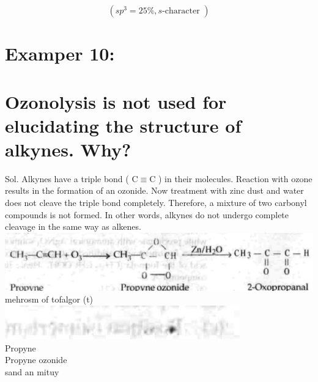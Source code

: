 \documentclass[10pt]{article}
\begin{document}
$$
\left(s p^{3}=25 \%, s \text {-character }\right)
$$

\section*{Examper 10:}
\section*{Ozonolysis is not used for elucidating the structure of alkynes. Why?}
Sol. Alkynes have a triple bond ( $\mathrm{C} \equiv \mathrm{C}$ ) in their molecules. Reaction with ozone results in the formation of an ozonide. Now treatment with zinc dust and water does not cleave the triple bond completely. Therefore, a mixture of two carbonyl compounds is not formed. In other words, alkynes do not undergo complete cleavage in the same way as alkenes.\\
\includegraphics[max width=\textwidth, center]{2025_01_28_8470952b98110cec3aabg-199(3)}\\
mehrosm of tofalgor (t)\\
\includegraphics[max width=\textwidth, center]{2025_01_28_8470952b98110cec3aabg-199(1)}\\
Propyne\\
Propyne ozonide\\
sand an mituy
\end{document}
